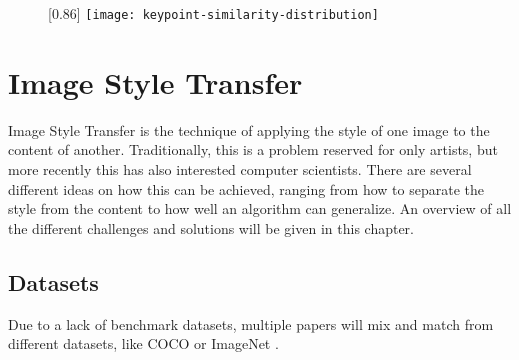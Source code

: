 \begin{figure}[h]
	\centering
	[0.86\textwidth]{
		\texttt{[image: keypoint-similarity-distribution]}%
	}
\end{figure}

\section{Image Style Transfer}
Image Style Transfer is the technique of applying the style of one image to the content of another.
Traditionally, this is a problem reserved for only artists, but more recently this has also interested computer scientists.
There are several different ideas on how this can be achieved,
ranging from how to separate the style from the content to how well an algorithm can generalize.
An overview of all the different challenges and solutions will be given in this chapter.

\subsection{Datasets}
Due to a lack of benchmark datasets, multiple papers will mix and match from different datasets, like \gls{COCO} or ImageNet \cite{Deng2009}.

